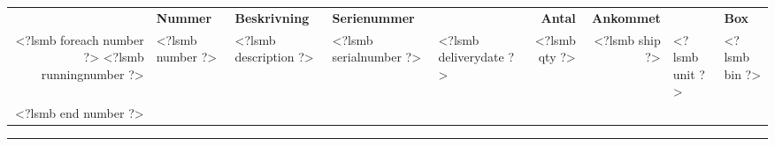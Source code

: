 \documentclass[twoside]{scrartcl}
\begin{document}
\begin{tabularx}{\textwidth}{@{}rlXllrrll@{}}
\vspace{1cm}
  
\begin{tabularx}{\textwidth}{@{}rlXllrrll@{}}
  \textbf{Pos} & \textbf{Nummer} & \textbf{Beskrivning} & \textbf{Serienummer} & & \textbf{Antal} & \textbf{Ankommet} & & \textbf{Box} \\

<?lsmb foreach number ?>
  <?lsmb runningnumber ?> & <?lsmb number ?> & <?lsmb description ?> & <?lsmb serialnumber ?> &
  <?lsmb deliverydate ?> & <?lsmb qty ?> & <?lsmb ship ?> & <?lsmb unit ?> & <?lsmb bin ?> \\
<?lsmb end number ?>
\end{tabularx}


\rule{\textwidth}{2pt}
\end{document}
